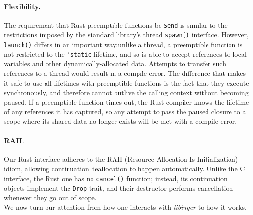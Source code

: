 \paragraph{Flexibility.}
The requirement that Rust preemptible functions be \texttt{Send} is similar to the
restrictions imposed by the standard library's thread \texttt{spawn()} interface.
However, \texttt{launch()} differs in an important way:\@ unlike a thread, a
preemptible function is not restricted to the \texttt{'static} lifetime, and so is
able to accept references to local variables and other dynamically-allocated data.
Attempts to transfer such references to a thread would result in a compile error.
The difference that makes it safe to use all lifetimes with preemptible functions is
the fact that they execute synchronously, and therefore cannot outlive the calling
context without becoming paused.  If a preemptible function times out, the Rust
compiler knows the lifetime of any references it has captured, so any attempt to pass
the paused closure to a scope where its shared data no longer exists will be met with
a compile error.


\paragraph{RAII.}
Our Rust interface adheres to the RAII (Resource Allocation Is Initialization) idiom,
allowing continuation deallocation to happen automatically.  Unlike the C interface,
the Rust one has no \texttt{cancel()} function; instead, its continuation objects
implement the \texttt{Drop} trait, and their destructor performs cancellation
whenever they go out of scope.
\\

We now turn our attention from how one interacts with \textit{libinger} to how it
works.




\begin{promotesubsections}

\end{promotesubsections}






